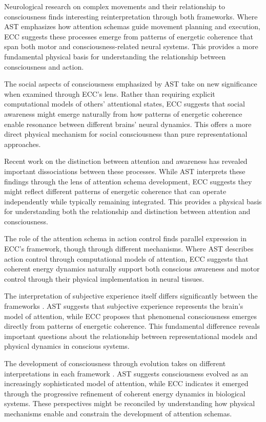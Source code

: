 \begin{refsection}
Neurological research on complex movements and their relationship to consciousness \cite{Graziano2002} finds interesting reinterpretation through both frameworks. Where AST emphasizes how attention schemas guide movement planning and execution, ECC suggests these processes emerge from patterns of energetic coherence that span both motor and consciousness-related neural systems. This provides a more fundamental physical basis for understanding the relationship between consciousness and action.

The social aspects of consciousness emphasized by AST \cite{Kelly2014} take on new significance when examined through ECC's lens. Rather than requiring explicit computational models of others' attentional states, ECC suggests that social awareness might emerge naturally from how patterns of energetic coherence enable resonance between different brains' neural dynamics. This offers a more direct physical mechanism for social consciousness than pure representational approaches.

Recent work on the distinction between attention and awareness \cite{Webb2016} has revealed important dissociations between these processes. While AST interprets these findings through the lens of attention schema development, ECC suggests they might reflect different patterns of energetic coherence that can operate independently while typically remaining integrated. This provides a physical basis for understanding both the relationship and distinction between attention and consciousness.

The role of the attention schema in action control \cite{WebbKemper2020} finds parallel expression in ECC's framework, though through different mechanisms. Where AST describes action control through computational models of attention, ECC suggests that coherent energy dynamics naturally support both conscious awareness and motor control through their physical implementation in neural tissues.

The interpretation of subjective experience itself differs significantly between the frameworks \cite{Graziano2019}. AST suggests that subjective experience represents the brain's model of attention, while ECC proposes that phenomenal consciousness emerges directly from patterns of energetic coherence. This fundamental difference reveals important questions about the relationship between representational models and physical dynamics in conscious systems.

The development of consciousness through evolution takes on different interpretations in each framework \cite{Graziano2013}. AST suggests consciousness evolved as an increasingly sophisticated model of attention, while ECC indicates it emerged through the progressive refinement of coherent energy dynamics in biological systems. These perspectives might be reconciled by understanding how physical mechanisms enable and constrain the development of attention schemas.


\end{refsection}
